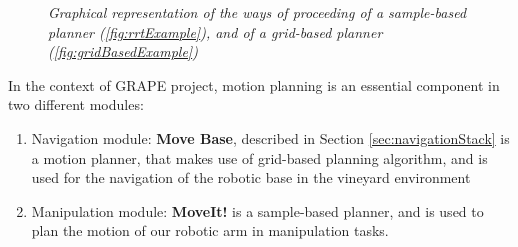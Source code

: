 \begin{figure}
	\centering
	\caption{\textit{Graphical representation of the ways of proceeding of a sample-based planner (\ref{fig:rrtExample}), and of a grid-based planner (\ref{fig:gridBasedExample})}}
	\label{fig:planningExamples}
\end{figure}

In the context of \ac{GRAPE} project, motion planning is an essential component in two different modules:
\begin{enumerate}
	\item Navigation module: \textbf{Move Base}, described in Section \ref{sec:navigationStack} is a motion planner, that makes use of grid-based planning algorithm, and is used for the navigation of the robotic base in the vineyard environment
	\item Manipulation module: \textbf{MoveIt!} is a sample-based planner, and is used to plan the motion of our robotic arm in manipulation tasks.
\end{enumerate}






